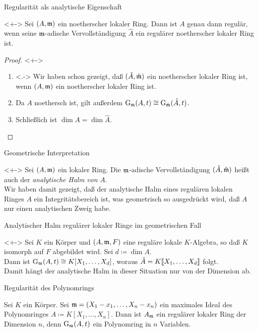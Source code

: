 \begin{frame}{Regularität als analytische Eigenschaft}
	\begin{proposition}<+->
		Sei \((A, \mathfrak{m})\) ein noetherscher lokaler Ring. Dann ist \(A\)
		genau dann regulär, wenn seine \(\mathfrak{m}\)-adische Vervollständigung
		\(\hat A\) ein regulärer noetherscher lokaler Ring ist.
	\end{proposition}
	\begin{proof}<+->
		\begin{enumerate}[<+->]
		\item<.->
			Wir haben schon gezeigt, daß \((\hat A, \hat{\mathfrak{m}})\) ein noetherscher 
			lokaler Ring ist, wenn \((A, \mathfrak{m})\) ein noetherscher lokaler Ring
			ist.
		\item
			Da \(A\) noethersch ist, gilt außerdem
			\(\operatorname{G}_{\mathfrak{m}}(A, t) \cong \operatorname{G}_{\hat{\mathfrak{m}}}(\hat A, t)\). 
		\item
			Schließlich ist \(\dim A = \dim{\hat A}\).
			\qedhere
		\end{enumerate}
	\end{proof}
\end{frame}

\begin{frame}{Geometrische Interpretation}
	\begin{remark}<+->
		Sei \((A, \mathfrak{m})\) ein lokaler Ring. Die \(\mathfrak{m}\)-adische
		Vervollständigung \((\hat A, \hat{\mathfrak{m}})\) heißt auch der
		\emph{analytische Halm von \(A\)}. 
		\\
		Wir haben damit gezeigt, daß der analytische Halm eines regulären
		lokalen Ringes \(A\) ein Integritätsbereich ist, was geometrisch so
		ausgedrückt wird, daß \(A\) nur einen analytischen Zweig habe. 
	\end{remark}
\end{frame}

\begin{frame}{Analytischer Halm regulärer lokaler Ringe im geometrischen Fall}
	\begin{example}<+->
		Sei \(K\) ein Körper und \((A, \mathfrak{m}, F)\) eine reguläre lokale
		\(K\)-Algebra, so daß \(K\) isomorph auf \(F\) abgebildet wird. 
		Sei \(d \coloneqq \dim A\).
		\\
		Dann ist \(\operatorname{G}_{\mathfrak{m}}(A, t) \cong K[X_1, \dotsc, X_d]\),
		woraus \(\hat A = K\llbracket X_1, \dotsc, X_d\rrbracket\) folgt.
		\\
		Damit hängt der analytische Halm in dieser Situation nur von der Dimension
		ab.
	\end{example}
\end{frame}

\begin{frame}{Regularität des Polynomrings}
	\begin{example}
		Sei \(K\) ein Körper. Sei \(\mathfrak{m} = (X_1 - x_1, \dotsc, X_n - x_n)\) ein
		maximales Ideal des Polynomringes \(A \coloneqq K[X_1, \dotsc, X_n]\).
		Dann ist \(A_{\mathfrak{m}}\) ein regulärer lokaler Ring der
		Dimension \(n\), denn
		\(\operatorname{G}_{\mathfrak{m}}(A, t)\) ein Polynomring in \(n\) Variablen.
	\end{example}
\end{frame}

